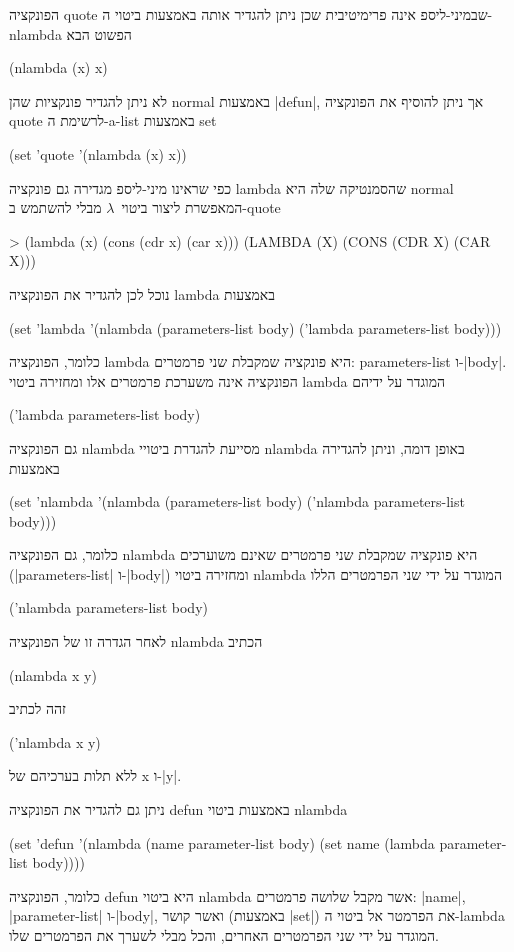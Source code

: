 הפונקציה quote שבמיני-ליספ אינה פרימיטיבית שכן ניתן להגדיר אותה באמצעות ביטוי
ה-nlambda הפשוט הבא
\begin{LISP}
(nlambda (x) x)
\end{LISP}
לא ניתן להגדיר פונקציות שהן normal באמצעות \E|defun|, אך ניתן להוסיף את הפונקציה
quote לרשימת ה-a-list באמצעות set
\begin{LIBRARY}
(set 'quote
  '(nlambda (x) x))
\end{LIBRARY}
כפי שראינו מיני-ליספ מגדירה גם פונקציה lambda שהסמנטיקה שלה היא normal המאפשרת
ליצור ביטוי~$λ$ מבלי להשתמש ב-quote
\begin{LISP}
> (lambda (x) (cons (cdr x) (car x)))
(LAMBDA (X) (CONS (CDR X) (CAR X)))
\end{LISP}
נוכל לכן להגדיר את הפונקציה lambda באמצעות
\begin{LIBRARY}
(set 'lambda
  '(nlambda (parameters-list body) ('lambda parameters-list body)))
\end{LIBRARY}
כלומר, הפונקציה lambda היא פונקציה שמקבלת שני פרמטרים: parameters-list
ו-\E|body|. הפונקציה אינה משערכת פרמטרים אלו ומחזירה ביטוי lambda המוגדר על ידיהם
\begin{LISP}
  ('lambda parameters-list body)
\end{LISP}
גם הפונקציה nlambda מסייעת להגדרת ביטויי nlambda באופן דומה, וניתן להגדירה
באמצעות
\begin{LIBRARY}
(set 'nlambda
  '(nlambda (parameters-list body) ('nlambda parameters-list body)))
\end{LIBRARY}
כלומר, גם הפונקציה nlambda היא פונקציה שמקבלת שני פרמטרים שאינם משוערכים
(\E|parameters-list| ו-\E|body|) ומחזירה ביטוי nlambda המוגדר על ידי
שני הפרמטרים הללו
\begin{LISP}
  ('nlambda parameters-list body)
\end{LISP}
לאחר הגדרה זו של הפונקציה nlambda הכתיב
\begin{LISP}
  (nlambda x y)
\end{LISP}
זהה לכתיב
\begin{LISP}
  ('nlambda x y)
\end{LISP}
ללא תלות בערכיהם של x ו-\E|y|.

ניתן גם להגדיר את הפונקציה defun באמצעות ביטוי nlambda
\begin{LIBRARY}
(set 'defun
  '(nlambda (name parameter-list body)
    (set name (lambda parameter-list body))))
\end{LIBRARY}
כלומר, הפונקציה defun היא ביטוי nlambda אשר מקבל שלושה פרמטרים: \E|name|,
\E|parameter-list| ו-\E|body|, ואשר קושר (באמצעות \E|set|) את הפרמטר אל ביטוי
ה-lambda המוגדר על ידי שני הפרמטרים האחרים, והכל מבלי לשערך את הפרמטרים שלו.

